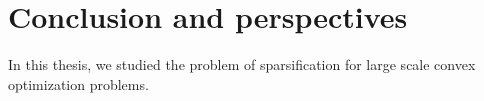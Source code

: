 \chapter*{Conclusion and perspectives}
\label{ch:conclusion}

In this thesis, we studied the problem of sparsification for large scale convex optimization problems.